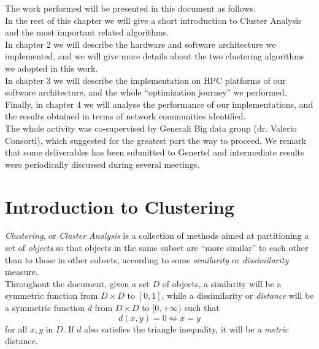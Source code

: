 \documentclass[a4paper,11pt]{book}
\begin{document}
The work performed will be presented in this document as follows.\\
In the rest of this chapter we will give a short introduction to Cluster Analysis and the most important related algorithms.\\
In chapter 2 we will describe the hardware and software architecture we implemented, and we will give more details about the two clustering algorithms we adopted in this work.\\
In chapter 3 we will describe the implementation on HPC platforms of our software architecture, and the whole ``optimization journey'' we performed.\\
Finally, in chapter 4 we will analyse the performance of our implementations, and the results obtained in terms of network communities identified.\\

The whole activity was co-supervised by Generali Big data group (dr. Valerio Consorti), which suggested for the greatest part the way to proceed. We remark that some deliverables has been submitted to Genertel and intermediate results were periodically discussed during several meetings.
\section{Introduction to Clustering}
\textit{Clustering}, or \textit{Cluster Analysis} is a collection of methods aimed at partitioning a set of \textit{objects} so that objects in the same subset are ``more similar'' to each other than to those in other subsets, according to some \textit{similarity} or \textit{dissimilarity} measure.\\
Throughout the document, given a set $D$ of objects, a similarity will be a symmetric function from $D\times D$ to $[0,1]$, while a dissimilarity or \textit{distance} will be a symmetric function $d$ from $D\times D$ to $[0,+\infty)$ such that
$$
d(x,y) = 0\Leftrightarrow x = y
$$
for all $x,y$ in $D$. If $d$ also satisfies the triangle inequality, it will be a \textit{metric} distance.\\
\end{document}
